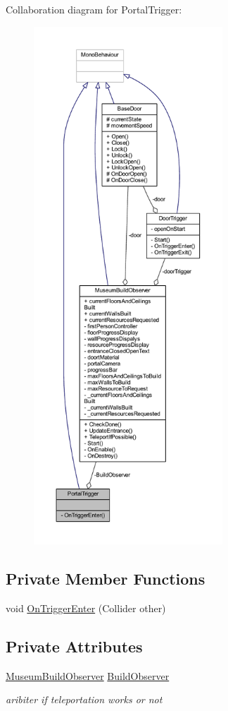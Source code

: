 Collaboration diagram for Portal\+Trigger\+:
\nopagebreak
\begin{figure}[H]
\begin{center}
\leavevmode
\includegraphics[height=550pt]{class_portal_trigger__coll__graph}
\end{center}
\end{figure}
\subsection*{Private Member Functions}
\begin{DoxyCompactItemize}
\item 
void \mbox{\hyperlink{class_portal_trigger_ae73070bf23c6348ced79aa839e0e2ad7}{On\+Trigger\+Enter}} (Collider other)
\end{DoxyCompactItemize}
\subsection*{Private Attributes}
\begin{DoxyCompactItemize}
\item 
\mbox{\hyperlink{class_museum_build_observer}{Museum\+Build\+Observer}} \mbox{\hyperlink{class_portal_trigger_a26ee63b0f443863cd4bc7a2626063f5b}{Build\+Observer}}
\begin{DoxyCompactList}\small\item\em aribiter if teleportation works or not \end{DoxyCompactList}\end{DoxyCompactItemize}


